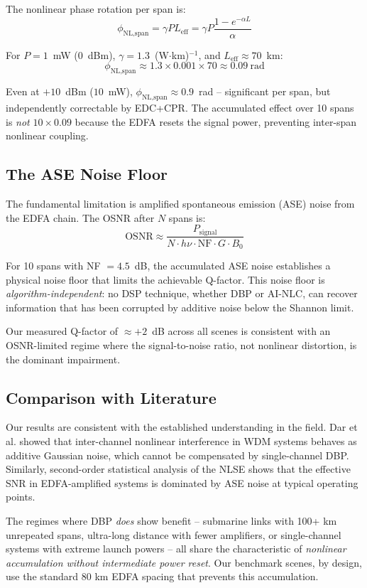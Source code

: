 \documentclass[conference]{IEEEtran}
\begin{document}
The nonlinear phase rotation per span is:
\[
\phi_{\text{NL,span}} = \gamma P L_{\text{eff}} = \gamma P \frac{1 - e^{-\alpha L}}{\alpha}
\]

For $P = 1$~mW ($0$~dBm), $\gamma = 1.3$~(W$\cdot$km)$^{-1}$, and $L_{\text{eff}} \approx 70$~km:
\[
\phi_{\text{NL,span}} \approx 1.3 \times 0.001 \times 70 \approx 0.09~\text{rad}
\]

Even at $+10$~dBm ($10$~mW), $\phi_{\text{NL,span}} \approx 0.9$~rad -- significant per span, but independently correctable by EDC+CPR. The accumulated effect over 10 spans is \textit{not} $10 \times 0.09$ because the EDFA resets the signal power, preventing inter-span nonlinear coupling.

\subsection{The ASE Noise Floor}

The fundamental limitation is amplified spontaneous emission (ASE) noise from the EDFA chain. The OSNR after $N$ spans is:
\[
\text{OSNR} \approx \frac{P_{\text{signal}}}{N \cdot h\nu \cdot \text{NF} \cdot G \cdot B_0}
\]

For 10 spans with NF $= 4.5$~dB, the accumulated ASE noise establishes a physical noise floor that limits the achievable Q-factor. This noise floor is \textit{algorithm-independent}: no DSP technique, whether DBP or AI-NLC, can recover information that has been corrupted by additive noise below the Shannon limit.

Our measured Q-factor of $\approx +2$~dB across all scenes is consistent with an OSNR-limited regime where the signal-to-noise ratio, not nonlinear distortion, is the dominant impairment.

\subsection{Comparison with Literature}

Our results are consistent with the established understanding in the field. Dar et al. \cite{dar2013interchannel} showed that inter-channel nonlinear interference in WDM systems behaves as additive Gaussian noise, which cannot be compensated by single-channel DBP. Similarly, second-order statistical analysis of the NLSE \cite{agrell2011second} shows that the effective SNR in EDFA-amplified systems is dominated by ASE noise at typical operating points.

The regimes where DBP \textit{does} show benefit -- submarine links with 100+ km unrepeated spans, ultra-long distance with fewer amplifiers, or single-channel systems with extreme launch powers \cite{ip2008compensation,jansen2008long} -- all share the characteristic of \textit{nonlinear accumulation without intermediate power reset}. Our benchmark scenes, by design, use the standard 80 km EDFA spacing that prevents this accumulation.
\end{document}
